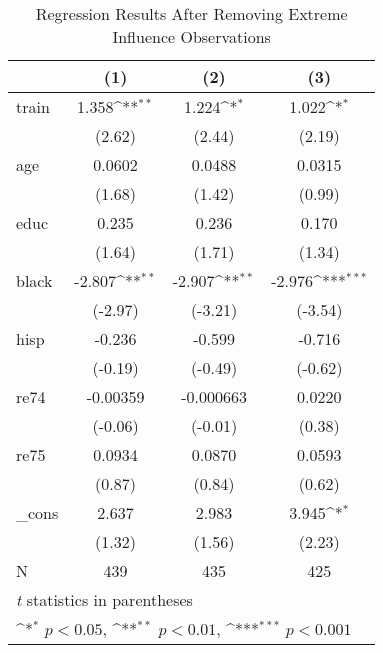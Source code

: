 \begin{table}[htbp]\centering
\def\sym#1{\ifmmode^{#1}\else\(^{#1}\)\fi}
\caption{Regression Results After Removing Extreme Influence Observations}
\begin{tabular}{l*{3}{c}}
\hline\hline
            &\multicolumn{1}{c}{(1)}         &\multicolumn{1}{c}{(2)}         &\multicolumn{1}{c}{(3)}         \\
\hline
train       &       1.358\sym{**} &       1.224\sym{*}  &       1.022\sym{*}  \\
            &      (2.62)         &      (2.44)         &      (2.19)         \\
[1em]
age         &      0.0602         &      0.0488         &      0.0315         \\
            &      (1.68)         &      (1.42)         &      (0.99)         \\
[1em]
educ        &       0.235         &       0.236         &       0.170         \\
            &      (1.64)         &      (1.71)         &      (1.34)         \\
[1em]
black       &      -2.807\sym{**} &      -2.907\sym{**} &      -2.976\sym{***}\\
            &     (-2.97)         &     (-3.21)         &     (-3.54)         \\
[1em]
hisp        &      -0.236         &      -0.599         &      -0.716         \\
            &     (-0.19)         &     (-0.49)         &     (-0.62)         \\
[1em]
re74        &    -0.00359         &   -0.000663         &      0.0220         \\
            &     (-0.06)         &     (-0.01)         &      (0.38)         \\
[1em]
re75        &      0.0934         &      0.0870         &      0.0593         \\
            &      (0.87)         &      (0.84)         &      (0.62)         \\
[1em]
\_cons      &       2.637         &       2.983         &       3.945\sym{*}  \\
            &      (1.32)         &      (1.56)         &      (2.23)         \\
\hline
N           &         439         &         435         &         425         \\
\hline\hline
\multicolumn{4}{l}{\footnotesize \textit{t} statistics in parentheses}\\
\multicolumn{4}{l}{\footnotesize \sym{*} \(p<0.05\), \sym{**} \(p<0.01\), \sym{***} \(p<0.001\)}\\
\end{tabular}
\end{table}
